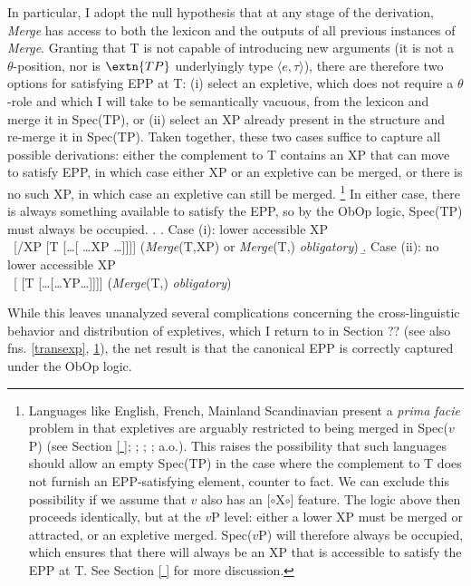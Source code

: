 \documentclass[11pt, letterpaper]{paper_nick}
\newcommand{\fm}[1]{[$\circ$#1$\circ$]}
\begin{document}
In particular, I adopt the null hypothesis that at any stage of the derivation, \emph{Merge} has access to both the lexicon and the outputs of all previous instances of \emph{Merge}. Granting that T is not capable of introducing new arguments (it is not a $\theta$-position, nor is $\extn{TP}$ underlyingly type $\langle e,\tau\rangle$), there are therefore two options for satisfying EPP at T: (i) select an expletive, which does not require a $\theta$-role and which I will take to be semantically vacuous, from the lexicon and merge it in Spec(TP), or (ii) select an XP already present in the structure and re-merge it in Spec(TP). Taken together, these two cases suffice to capture all possible derivations: either the complement to T contains an XP that can move to satisfy EPP, in which case either XP or an expletive can be merged, or there is no such XP, in which case an expletive can still be merged.
\footnote{\label{expl1} Languages like English, French, Mainland Scandinavian present a \emph{prima facie} problem in that expletives are arguably restricted to being merged in Spec($v$P) (see Section \ref{ }; \citealt{richards06}; \citealt{deal09}; \citealt{wu}; a.o.). This raises the possibility that such languages should allow an empty Spec(TP) in the case where the complement to T does not furnish an EPP-satisfying element, counter to fact. We can exclude this possibility if we assume that $v$ also has an \fm{X} feature. The logic above then proceeds identically, but at the $v$P level: either a lower XP must be merged or attracted, or an expletive merged. Spec($v$P) will therefore always be occupied, which ensures that there will always be an XP that is accessible to satisfy the EPP at T. See Section \ref{ } for more discussion.} In either case, there is always something available to satisfy the EPP, so by the ObOp logic, Spec(TP) must always be occupied. 
\ex. \a. Case (i): lower accessible XP\\
\ [/XP [T [\ldots[ \ldots XP \ldots]]]] \hfill (\emph{Merge}(T,XP) or \emph{Merge}(T,) \emph{obligatory})
\b. Case (ii): no lower accessible XP\\
\ [ [T [\ldots[\ldots YP\ldots]]]] \hfill (\emph{Merge}(T,) \emph{obligatory})

While this leaves unanalyzed several complications concerning the cross-linguistic behavior and distribution of expletives, which I return to in Section ?? (see also fns. \ref{transexp}, \ref{expl1}), the net result is that the canonical EPP is correctly captured under the ObOp logic. 
\end{document}
